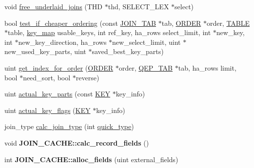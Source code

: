 \begin{DoxyCompactItemize}
\item 
void \mbox{\hyperlink{group__Query__Optimizer_ga59080a3acd829efcf18fc56d51df215c}{free\+\_\+underlaid\+\_\+joins}} (T\+HD $\ast$thd, S\+E\+L\+E\+C\+T\+\_\+\+L\+EX $\ast$select)
\item 
bool \mbox{\hyperlink{group__Query__Optimizer_ga3eec84bb823e8a5ea10710e1e4f066d1}{test\+\_\+if\+\_\+cheaper\+\_\+ordering}} (const \mbox{\hyperlink{classJOIN__TAB}{J\+O\+I\+N\+\_\+\+T\+AB}} $\ast$tab, \mbox{\hyperlink{structst__order}{O\+R\+D\+ER}} $\ast$order, \mbox{\hyperlink{structTABLE}{T\+A\+B\+LE}} $\ast$table, \mbox{\hyperlink{classBitmap_3_0164_01_4}{key\+\_\+map}} usable\+\_\+keys, int ref\+\_\+key, ha\+\_\+rows select\+\_\+limit, int $\ast$new\+\_\+key, int $\ast$new\+\_\+key\+\_\+direction, ha\+\_\+rows $\ast$new\+\_\+select\+\_\+limit, uint $\ast$new\+\_\+used\+\_\+key\+\_\+parts, uint $\ast$saved\+\_\+best\+\_\+key\+\_\+parts)
\item 
uint \mbox{\hyperlink{group__Query__Optimizer_ga92d8a0c25d038fddac9b92696f6845e3}{get\+\_\+index\+\_\+for\+\_\+order}} (\mbox{\hyperlink{structst__order}{O\+R\+D\+ER}} $\ast$order, \mbox{\hyperlink{classQEP__TAB}{Q\+E\+P\+\_\+\+T\+AB}} $\ast$tab, ha\+\_\+rows limit, bool $\ast$need\+\_\+sort, bool $\ast$reverse)
\item 
uint \mbox{\hyperlink{group__Query__Optimizer_ga6609ac0420a8a415d5a57cc6659f460d}{actual\+\_\+key\+\_\+parts}} (const \mbox{\hyperlink{structst__key}{K\+EY}} $\ast$key\+\_\+info)
\item 
uint \mbox{\hyperlink{group__Query__Optimizer_ga174d79a5aef2a8abd1caec143b42837e}{actual\+\_\+key\+\_\+flags}} (\mbox{\hyperlink{structst__key}{K\+EY}} $\ast$key\+\_\+info)
\item 
join\+\_\+type \mbox{\hyperlink{group__Query__Optimizer_gaaf336d1a31135fd93a5564c5e090b50a}{calc\+\_\+join\+\_\+type}} (int \mbox{\hyperlink{sql__select_8h_a931d06905210c0f917b25d180eeb643f}{quick\+\_\+type}})
\item 
\mbox{\label{group__Query__Optimizer_gaa52eaf58ec1438c6d387b55e4035e504}} 
void {\bfseries J\+O\+I\+N\+\_\+\+C\+A\+C\+H\+E\+::calc\+\_\+record\+\_\+fields} ()
\item 
\mbox{\label{group__Query__Optimizer_gaa64e01213d7f5f755d1ff689d5e46fd8}} 
int {\bfseries J\+O\+I\+N\+\_\+\+C\+A\+C\+H\+E\+::alloc\+\_\+fields} (uint external\+\_\+fields)
\item 
\mbox{\label{group__Query__Optimizer_ga631f7419905d1b8199d14f5fd11926d4}} 

\end{DoxyCompactItemize}
